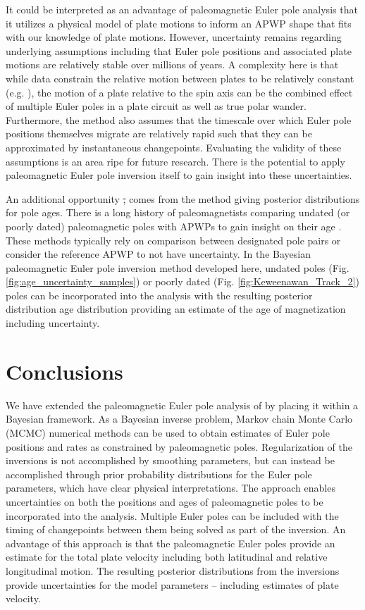 \documentclass[]{agujournal2019}
\providecommand{\DIFdel}[1]{{\protect\color{red}\sout{#1}}}                      %
\providecommand{\DIFdelbegin}{} %
\providecommand{\DIFdelend}{} %
\begin{document}
It could be interpreted as an advantage of paleomagnetic Euler pole analysis that it utilizes a physical model of plate motions to inform an APWP shape that fits with our knowledge of plate motions. However, uncertainty remains regarding underlying assumptions including that Euler pole positions and associated plate motions are relatively stable over millions of years. A complexity here is that while data constrain the relative motion between plates to be relatively constant (e.g. ), the motion of a plate relative to the spin axis can be the combined effect of multiple Euler poles in a plate circuit as well as true polar wander. Furthermore, the method also assumes that the timescale over which Euler pole positions themselves migrate are relatively rapid such that they can be approximated by instantaneous changepoints. Evaluating the validity of these assumptions is an area ripe for future research. There is the potential to apply paleomagnetic Euler pole inversion itself to gain insight into these uncertainties.

An additional opportunity \DIFdelbegin \DIFdel{, }\DIFdelend comes from the method giving posterior distributions for pole ages. There is a long history of paleomagnetists comparing undated (or poorly dated) paleomagnetic poles with APWPs to gain insight on their age \cite{McCabe1984b, Hnatyshin2014a}. These methods typically rely on comparison between designated pole pairs or consider the reference APWP to not have uncertainty. In the Bayesian paleomagnetic Euler pole inversion method developed here, undated poles (Fig. \ref{fig:age_uncertainty_samples}) or poorly dated (Fig. \ref{fig:Keweenawan_Track_2}) poles can be incorporated into the analysis with the resulting posterior distribution age distribution providing an estimate of the age of magnetization including uncertainty. 

\section*{Conclusions}
\label{sec:conclusions}

We have extended the paleomagnetic Euler pole analysis of  by placing it within a Bayesian framework. As a Bayesian inverse problem, Markov chain Monte Carlo (MCMC) numerical methods can be used to obtain estimates of Euler pole positions and rates as constrained by paleomagnetic poles. Regularization of the inversions is not accomplished by smoothing parameters, but can instead be accomplished through prior probability distributions for the Euler pole parameters, which have clear physical interpretations. The approach enables uncertainties on both the positions and ages of paleomagnetic poles to be incorporated into the analysis. Multiple Euler poles can be included with the timing of changepoints between them being solved as part of the inversion. An advantage of this approach is that the paleomagnetic Euler poles provide an estimate for the total plate velocity including both latitudinal and relative longitudinal motion. The resulting posterior distributions from the inversions provide uncertainties for the model parameters -- including estimates of plate velocity.
\end{document}
